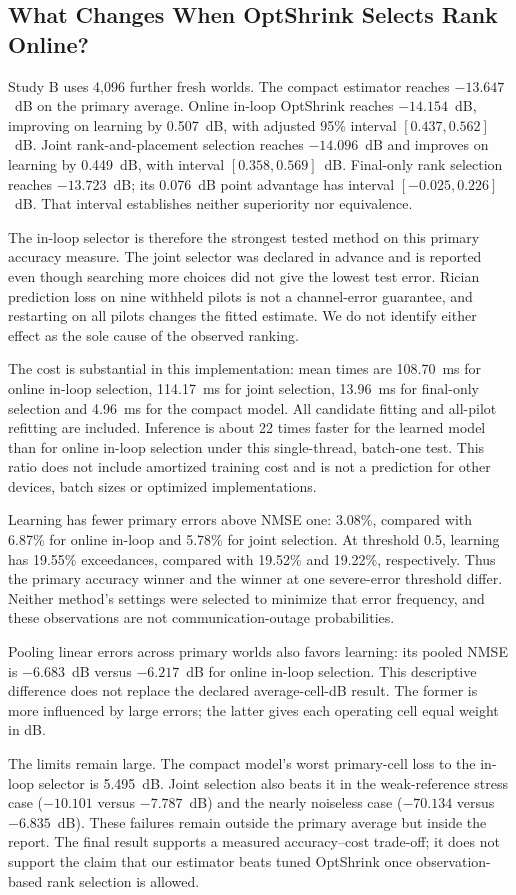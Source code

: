 \subsection{What Changes When OptShrink Selects Rank Online?}
Study B uses 4,096 further fresh worlds. The compact estimator reaches
$-13.647$~dB on the primary average. Online in-loop OptShrink reaches
$-14.154$~dB, improving on learning by 0.507~dB, with adjusted 95\%
interval $[0.437,0.562]$~dB. Joint rank-and-placement selection reaches
$-14.096$~dB and improves on learning by 0.449~dB, with interval
$[0.358,0.569]$~dB. Final-only rank selection reaches $-13.723$~dB;
its 0.076~dB point advantage has interval $[-0.025,0.226]$~dB.
That interval establishes neither superiority nor equivalence.

The in-loop selector is therefore the strongest tested method on
this primary accuracy measure. The joint selector was declared in
advance and is reported even though searching more choices did not
give the lowest test error. Rician prediction loss on nine withheld
pilots is not a channel-error guarantee, and restarting on all pilots
changes the fitted estimate. We do not identify either effect as the
sole cause of the observed ranking.

The cost is substantial in this implementation: mean times are
108.70~ms for online in-loop selection, 114.17~ms for joint selection,
13.96~ms for final-only selection and 4.96~ms for the compact model.
All candidate fitting and all-pilot refitting are included. Inference
is about 22 times faster for the learned model than for online in-loop
selection under this single-thread, batch-one test. This ratio does
not include amortized training cost and is not a prediction for other
devices, batch sizes or optimized implementations.

Learning has fewer primary errors above NMSE one: 3.08\%, compared
with 6.87\% for online in-loop and 5.78\% for joint selection. At
threshold 0.5, learning has 19.55\% exceedances, compared with
19.52\% and 19.22\%, respectively. Thus the primary accuracy winner
and the winner at one severe-error threshold differ. Neither
method's settings were selected to minimize that error frequency,
and these observations are not communication-outage probabilities.

Pooling linear errors across primary worlds also favors learning:
its pooled NMSE is $-6.683$~dB versus $-6.217$~dB for online in-loop
selection. This descriptive difference does not replace the declared
average-cell-dB result. The former is more influenced by large errors;
the latter gives each operating cell equal weight in dB.

The limits remain large. The compact model's worst primary-cell loss
to the in-loop selector is 5.495~dB. Joint selection also beats it in
the weak-reference stress case ($-10.101$ versus $-7.787$~dB) and
the nearly noiseless case ($-70.134$ versus $-6.835$~dB). These
failures remain outside the primary average but inside the report.
The final result supports a measured accuracy--cost trade-off; it
does not support the claim that our estimator beats tuned OptShrink
once observation-based rank selection is allowed.
